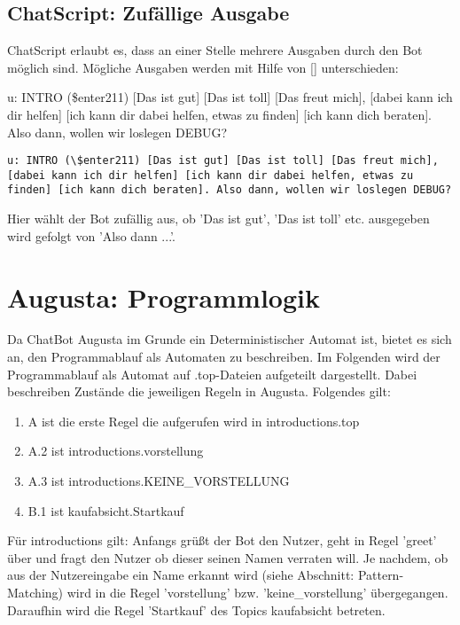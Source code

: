 \section{ChatScript: Zufällige Ausgabe}
\label{sec:ChatScript: Zufällige Ausgabe}

ChatScript erlaubt es, dass an einer Stelle mehrere Ausgaben durch den Bot möglich sind. Mögliche Ausgaben werden mit Hilfe von [] unterschieden:

u: INTRO (\$enter211) [Das ist gut] [Das ist toll] [Das freut mich], [dabei kann ich dir helfen] [ich kann dir dabei helfen, etwas zu finden] [ich kann dich beraten]. Also dann, wollen wir loslegen DEBUG?

\begin{lstlisting}[caption={Regel in keyexonesentence.top}]
u: INTRO (\$enter211) [Das ist gut] [Das ist toll] [Das freut mich], [dabei kann ich dir helfen] [ich kann dir dabei helfen, etwas zu finden] [ich kann dich beraten]. Also dann, wollen wir loslegen DEBUG?
\end{lstlisting}

Hier wählt der Bot zufällig aus, ob 'Das ist gut', 'Das ist toll' etc. ausgegeben wird gefolgt von 'Also dann ...'. 

\chapter{Augusta: Programmlogik}
\label{sec:Augusta: Programmlogik}

Da ChatBot Augusta im Grunde ein Deterministischer Automat ist, bietet es sich an, den Programmablauf als Automaten zu beschreiben. Im Folgenden wird der Programmablauf als Automat auf .top-Dateien aufgeteilt dargestellt. Dabei beschreiben Zustände die jeweiligen Regeln in Augusta. 
Folgendes gilt:

\begin{enumerate}
\item{A ist die erste Regel die aufgerufen wird in introductions.top}
\item{A.2 ist introductions.vorstellung}
\item{A.3 ist introductions.KEINE_VORSTELLUNG}
\item{B.1 ist kaufabsicht.Startkauf}
\end{enumerate}

Für introductions gilt: Anfangs grüßt der Bot den Nutzer, geht in Regel 'greet' über und fragt den Nutzer ob dieser seinen Namen verraten will. Je nachdem, ob aus der Nutzereingabe ein Name erkannt wird (siehe Abschnitt: Pattern-Matching) wird in die Regel 'vorstellung' bzw. 'keine_vorstellung' übergegangen. Daraufhin wird die Regel 'Startkauf' des Topics kaufabsicht betreten. 

